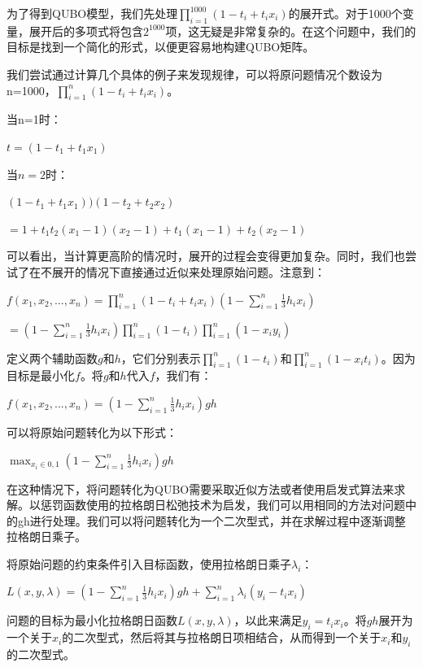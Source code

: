 \documentclass{MathorCupmodeling}
\begin{document}
为了得到QUBO模型，我们先处理$\prod_{i=1}^{1000}(1-t_{i}+t_{i}x_{i})$的展开式。对于1000个变量，展开后的多项式将包含$2^{1000}$项，这无疑是非常复杂的。在这个问题中，我们的目标是找到一个简化的形式，以便更容易地构建QUBO矩阵。

我们尝试通过计算几个具体的例子来发现规律，可以将原问题情况个数设为n=1000，$\prod_{i=1}^{n}(1-t_{i}+t_{i}x_{i})$。

当n=1时：
\begin{center}
$t = (1-t_1+t_1x_1)$
\end{center}
当$n = 2$时：
\begin{center}
$(1-t_1+t_1x_1))(1-t_2+t_2x_2)$

$= 1+t_1t_2(x_1-1)(x_2-1)+t_1(x_1-1)+t_2(x_2-1)$
\end{center}
可以看出，当计算更高阶的情况时，展开的过程会变得更加复杂。同时，我们也尝试了在不展开的情况下直接通过近似来处理原始问题。注意到：
\begin{center}
    
$f(x_1, x_2, ..., x_n) = \prod_{i=1}^{n}(1-t_{i}+t_{i}x_{i})(1-\sum_{i=1}^{n}\frac{1}{3}h_{i}x_{i})$

$ = (1-\sum_{i=1}^{n}\frac{1}{3}h_{i}x_{i}) \prod_{i=1}^{n}(1-t_i) \prod_{i=1}^{n}(1-x_iy_i)$
\end{center}
定义两个辅助函数$g$和$h$，它们分别表示$\prod_{i=1}^{n}(1-t_i)$和$\prod_{i=1}^{n}(1-x_it_i)$。因为目标是最小化$f$。将$g$和$h$代入$f$，我们有：
\begin{center}
$f(x_1, x_2, ..., x_n) = (1-\sum_{i=1}^{n}\frac{1}{3}h_{i}x_{i}) gh$
\end{center}
可以将原始问题转化为以下形式：
\begin{center}
$ \max_{x_i \in {0, 1}} (1-\sum_{i=1}^{n}\frac{1}{3}h_{i}x_{i}) gh$
\end{center}

在这种情况下，将问题转化为QUBO需要采取近似方法或者使用启发式算法来求解。以惩罚函数使用的拉格朗日松弛技术为启发，我们可以用相同的方法对问题中的gh进行处理。我们可以将问题转化为一个二次型式，并在求解过程中逐渐调整拉格朗日乘子。

将原始问题的约束条件引入目标函数，使用拉格朗日乘子$\lambda_i$：

$L(x, y, \lambda) = (1-\sum_{i=1}^{n}\frac{1}{3}h_{i}x_{i}) gh + \sum_{i=1}^{n} \lambda_i (y_i - t_i x_i)$

问题的目标为最小化拉格朗日函数$L(x, y, \lambda)$，以此来满足$y_i = t_i x_i$。将$gh$展开为一个关于$x_i$的二次型式，然后将其与拉格朗日项相结合，从而得到一个关于$x_i$和$y_i$的二次型式。
\end{document}

